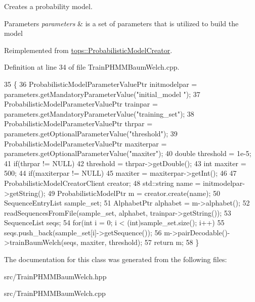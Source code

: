 Creates a probability model. 


\begin{DoxyParams}{Parameters}
{\em parameters} & is a set of parameters that is utilized to build the model \\
\hline
\end{DoxyParams}


Reimplemented from \hyperlink{classtops_1_1ProbabilisticModelCreator_afed6c8ffa45fff446bdaa8b533da8f7c}{tops\+::\+Probabilistic\+Model\+Creator}.



Definition at line 34 of file Train\+P\+H\+M\+M\+Baum\+Welch.\+cpp.


\begin{DoxyCode}
35   \{
36     ProbabilisticModelParameterValuePtr initmodelpar = parameters.getMandatoryParameterValue(\textcolor{stringliteral}{"initial\_model
      "});
37     ProbabilisticModelParameterValuePtr trainpar = parameters.getMandatoryParameterValue(\textcolor{stringliteral}{"training\_set"});
38     ProbabilisticModelParameterValuePtr thrpar = parameters.getOptionalParameterValue(\textcolor{stringliteral}{"threshold"});
39     ProbabilisticModelParameterValuePtr maxiterpar = parameters.getOptionalParameterValue(\textcolor{stringliteral}{"maxiter"});
40     \textcolor{keywordtype}{double} threshold = 1e-5;
41     \textcolor{keywordflow}{if}(thrpar != NULL)
42       threshold = thrpar->getDouble();
43     \textcolor{keywordtype}{int} maxiter = 500;
44     \textcolor{keywordflow}{if}(maxiterpar != NULL)
45       maxiter = maxiterpar->getInt();
46 
47     ProbabilisticModelCreatorClient creator;
48     std::string name = initmodelpar->getString();
49     ProbabilisticModelPtr m = creator.create(name);
50     SequenceEntryList sample\_set;
51     AlphabetPtr alphabet = m->alphabet();
52     readSequencesFromFile(sample\_set, alphabet, trainpar->getString());
53     SequenceList seqs;
54     \textcolor{keywordflow}{for}(\textcolor{keywordtype}{int} i = 0; i < (int)sample\_set.size(); i++)
55       seqs.push\_back(sample\_set[i]->getSequence());
56     m->pairDecodable()->trainBaumWelch(seqs, maxiter, threshold);
57     \textcolor{keywordflow}{return} m;
58   \}
\end{DoxyCode}


The documentation for this class was generated from the following files\+:\begin{DoxyCompactItemize}
\item 
src/Train\+P\+H\+M\+M\+Baum\+Welch.\+hpp\item 
src/Train\+P\+H\+M\+M\+Baum\+Welch.\+cpp\end{DoxyCompactItemize}
